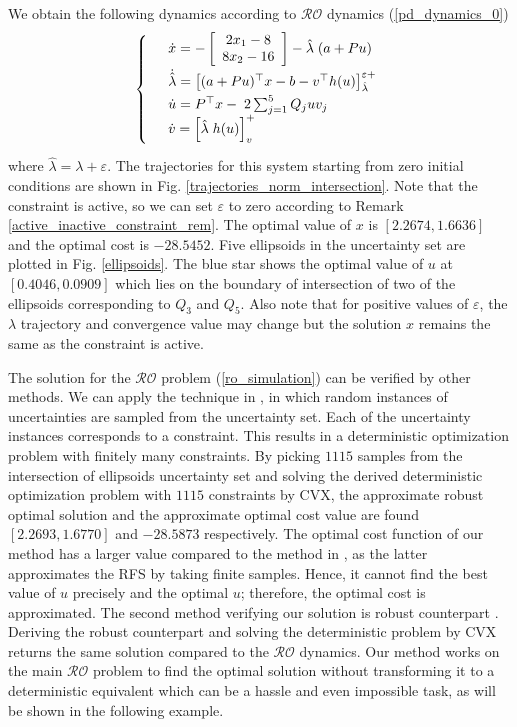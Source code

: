 \documentclass[journal,twoside,web]{ieeecolor}
\begin{document}
We obtain the following dynamics according to $\mathcal{RO}$ dynamics (\ref{pd_dynamics_0})
\begin{align*}
\left\{
\begin{array}{cl}
\vspace{1mm}
&\dot x=-\left[\begin{array}{ccl} 2x_1-8\\8x_2-16 \end{array}\right]-\hat{\lambda}\;(a+Pu)\\
\vspace{1mm}
&\dot {\hat{\lambda}} = \big[(a+Pu)^\top x-b-v ^\top h(u)\big]_{\hat{\lambda}}^{\varepsilon+}\\
&\dot u=P^\top x-\;2\sum_{j=1}^5 Q_j u v_{j}\\
\vspace{1mm}
&\dot v=\left[\hat{\lambda}\; h(u) \right]_{v}^+
\end{array}
\vspace{1mm}
\right.
\end{align*}
where $\hat{\lambda}=\lambda+\varepsilon$.
The trajectories for this system starting from zero initial conditions are shown in Fig. \ref{trajectories_norm_intersection}. Note that the constraint is active, so we can set $\varepsilon$ to zero according to Remark \ref{active_inactive_constraint_rem}. The optimal value of $x$ is $[2.2674,1.6636]$ and the optimal cost is $-28.5452$. Five ellipsoids in the uncertainty set are plotted in Fig. \ref{ellipsoids}. The blue star shows the optimal value of $u$ at $[0.4046,0.0909]$ which lies on the boundary of intersection of two of the ellipsoids corresponding to $Q_3$ and $Q_5$.
Also note that for positive values of $\varepsilon$, the $\lambda$ trajectory and convergence value may change but the solution $x$ remains the same as the constraint is active.

The solution for the $\mathcal{RO}$ problem (\ref{ro_simulation}) can be verified by other methods. We can apply the technique in \cite{calafiore2004}, in which random instances of uncertainties are sampled from the uncertainty set. Each of the uncertainty instances corresponds to a constraint. This results in a deterministic optimization problem with finitely many constraints.  By picking $1115$ samples from the intersection of ellipsoids uncertainty set and solving the derived deterministic optimization problem with $1115$ constraints by CVX, the approximate robust optimal solution and the approximate optimal cost value are found $[2.2693, 1.6770]$ and $-28.5873$ respectively. The optimal cost function of our method has a larger value compared to the method in \cite{calafiore2004}, as the latter approximates the RFS by taking finite samples. Hence, it cannot find the best value of $u$ precisely and the optimal $u$; therefore, the optimal cost is approximated. The second method verifying our solution is robust counterpart \cite{bental2009}. Deriving the robust counterpart and solving the deterministic problem by CVX returns the same solution compared to the $\mathcal{RO}$ dynamics. Our method works on the main $\mathcal{RO}$ problem to find the optimal solution without transforming it to a deterministic equivalent which can be a hassle and even impossible task, as will be shown in the following example.
\end{document}
